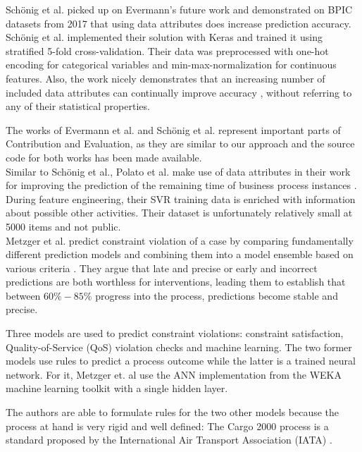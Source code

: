 Schönig et al. \cite{schoenig2018} picked up on Evermann's future work and demonstrated on BPIC datasets from 2017 that using data attributes does increase prediction accuracy. Schönig et al. implemented their solution with Keras and trained it using stratified 5-fold cross-validation. Their data was preprocessed with one-hot encoding for categorical variables and min-max-normalization for continuous features. Also, the work nicely demonstrates that an increasing number of included data attributes can continually improve accuracy \cite[p.5]{schoenig2018}, without referring to any of their statistical properties.

The works of Evermann et al. and Schönig et al. represent important parts of Contribution and Evaluation, as they are similar to our approach and the source code for both works has been made available.\\

Similar to Schönig et al., Polato et al. make use of data attributes in their work for improving the prediction of the remaining time of business process instances \cite{polato2014}. During feature engineering, their SVR training data is enriched with information about possible other activities. Their dataset is unfortunately relatively small at 5000 items and not public.\\

Metzger et al. predict constraint violation of a case by comparing fundamentally different prediction models and combining them into a model ensemble based on various criteria \cite{metzger2015}. They argue that late and precise or early and incorrect predictions are both worthless for interventions, leading them to establish that between $60\% - 85\%$ progress into the process, predictions become stable and precise.

Three models are used to predict constraint violations: constraint satisfaction, Quality-of-Service (QoS) violation checks and machine learning. The two former models use rules to predict a process outcome while the latter is a trained neural network. For it, Metzger et. al use the ANN implementation from the WEKA machine learning toolkit with a single hidden layer. 

The authors are able to formulate rules for the two other models because the process at hand is very rigid and well defined: The Cargo 2000 process is a standard proposed by the International Air Transport Association (IATA) \cite{metzger2015}.\\

